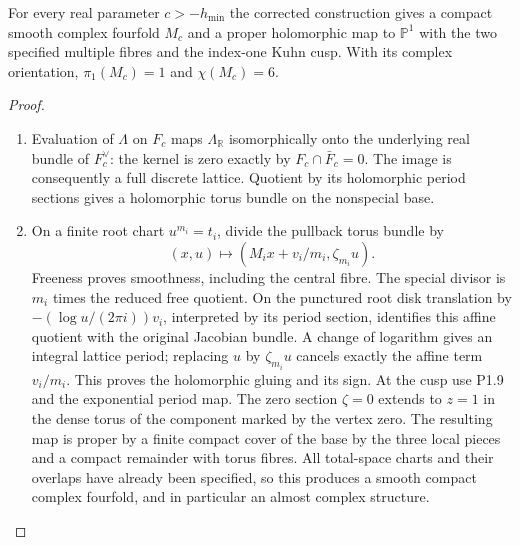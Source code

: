 \begin{theorem}\label{night:P1.10}
For every real parameter $c>-h_{\min}$ the corrected construction gives
a compact smooth complex fourfold $M_c$ and a proper holomorphic map
to $\mathbb P^1$ with the two specified multiple fibres and the
index-one Kuhn cusp.  With its complex orientation,
$\pi_1(M_c)=1$ and $\chi(M_c)=6$.
\end{theorem}
\begin{proof}
\begin{enumerate}[label=\arabic*.]
\item Evaluation of $\Lambda$ on $F_c$ maps $\Lambda_{\mathbb R}$
isomorphically onto the underlying real bundle of $F_c^\vee$:
the kernel is zero exactly by $F_c\cap\bar F_c=0$.
The image is consequently a full discrete lattice.  Quotient by its
holomorphic period sections gives a holomorphic torus bundle on the
nonspecial base.

\item On a finite root chart $u^{m_i}=t_i$, divide the pullback torus bundle by
\[
(x,u)\longmapsto(M_ix+v_i/m_i,\zeta_{m_i}u).
\]
Freeness proves smoothness, including the central fibre.  The special
divisor is $m_i$ times the reduced free quotient.  On the punctured
root disk translation by
$-(\log u/(2\pi i))v_i$, interpreted by its period section, identifies
this affine quotient with the original Jacobian bundle.  A change of
logarithm gives an integral lattice period; replacing $u$ by
$\zeta_{m_i}u$ cancels exactly the affine term $v_i/m_i$.
This proves the holomorphic gluing and its sign.
At the cusp use P1.9 and the exponential period map.  The zero section
$\zeta=0$ extends to $z=1$ in the dense torus of the component marked
by the vertex zero.  The resulting map is proper by a finite compact
cover of the base by the three local pieces and a compact remainder
with torus fibres.  All total-space charts and their overlaps have
already been specified, so this produces a smooth compact complex
fourfold, and in particular an almost complex structure.


\end{enumerate}
\end{proof}

